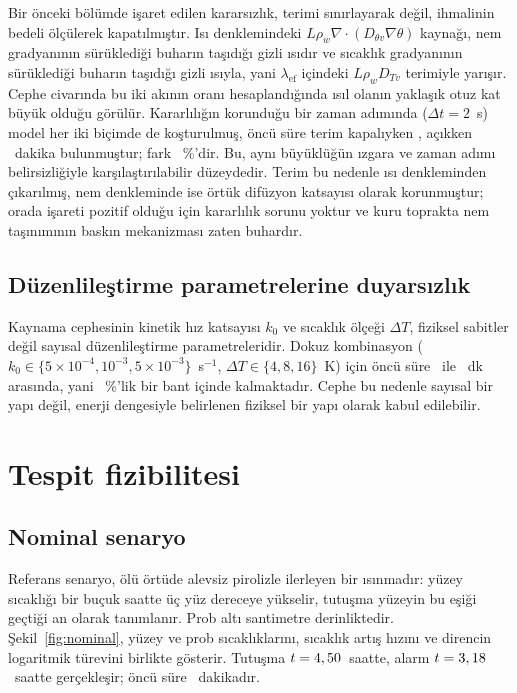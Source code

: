 \documentclass[11pt,a4paper]{article}
\newcommand{\Div}{\nabla\!\cdot\!}
\begin{document}
Bir önceki bölümde işaret edilen kararsızlık, terimi sınırlayarak değil,
ihmalinin bedeli ölçülerek kapatılmıştır. Isı denklemindeki
$L\rho_w \Div(D_{\theta v}\nabla\theta)$ kaynağı, nem gradyanının sürüklediği
buharın taşıdığı gizli ısıdır ve sıcaklık gradyanının sürüklediği buharın
taşıdığı gizli ısıyla, yani $\lambda_{\mathrm{ef}}$ içindeki
$L\rho_w D_{Tv}$ terimiyle yarışır. Cephe civarında bu iki akının oranı
hesaplandığında ısıl olanın yaklaşık otuz kat büyük olduğu görülür. Kararlılığın
korunduğu bir zaman adımında ($\Delta t = 2$~s) model her iki biçimde de
koşturulmuş, öncü süre terim kapalıyken \latentOff, açıkken \latentOn~dakika
bulunmuştur; fark \latentDelta~\%'dir. Bu, aynı büyüklüğün ızgara ve zaman
adımı belirsizliğiyle karşılaştırılabilir düzeydedir. Terim bu nedenle ısı
denkleminden çıkarılmış, nem denkleminde ise örtük difüzyon katsayısı olarak
korunmuştur; orada işareti pozitif olduğu için kararlılık sorunu yoktur ve kuru
toprakta nem taşınımının baskın mekanizması zaten buhardır.

\subsection{Düzenlileştirme parametrelerine duyarsızlık}
\label{sec:reg}

Kaynama cephesinin kinetik hız katsayısı $k_0$ ve sıcaklık ölçeği $\Delta T$,
fiziksel sabitler değil sayısal düzenlileştirme parametreleridir. Dokuz
kombinasyon ($k_0 \in \{5\times10^{-4}, 10^{-3}, 5\times10^{-3}\}$~s$^{-1}$,
$\Delta T \in \{4,8,16\}$~K) için öncü süre \regLo\ ile \regHi~dk arasında,
yani \regSpread~\%'lik bir bant içinde kalmaktadır. Cephe bu nedenle sayısal
bir yapı değil, enerji dengesiyle belirlenen fiziksel bir yapı olarak kabul
edilebilir.

\section{Tespit fizibilitesi}

\subsection{Nominal senaryo}

Referans senaryo, ölü örtüde alevsiz pirolizle ilerleyen bir ısınmadır: yüzey
sıcaklığı bir buçuk saatte üç yüz dereceye yükselir, tutuşma yüzeyin bu eşiği
geçtiği an olarak tanımlanır. Prob altı santimetre derinliktedir.
Şekil~\ref{fig:nominal}, yüzey ve prob sıcaklıklarını, sıcaklık artış hızını
ve direncin logaritmik türevini birlikte gösterir. Tutuşma $t=4,50$~saatte,
alarm $t=3,18$~saatte gerçekleşir; öncü süre \leadNom~dakikadır.
\end{document}

